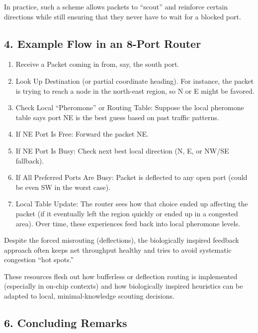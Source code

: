 \documentclass[../HFT-main.tex]{subfiles} %
\begin{document}
In practice, such a scheme allows packets to “scout” and reinforce certain directions while still ensuring that they never have to wait for a blocked port.

\subsection{4. Example Flow in an 8-Port Router}

\begin{enumerate}
\item	Receive a Packet coming in from, say, the south port.
\item	Look Up Destination (or partial coordinate heading). For instance, the packet is trying to reach a node in the north-east region, so N or E might be favored.
\item	Check Local “Pheromone” or Routing Table: Suppose the local pheromone table says port NE is the best guess based on past traffic patterns.
\item	If NE Port Is Free: Forward the packet NE.
\item	If NE Port Is Busy: Check next best local direction (N, E, or NW/SE fallback).
\item	If All Preferred Ports Are Busy: Packet is deflected to any open port (could be even SW in the worst case).
\item	Local Table Update: The router sees how that choice ended up affecting the packet (if it eventually left the region quickly or ended up in a congested area). Over time, these experiences feed back into local pheromone levels.
\end{enumerate}

Despite the forced misrouting (deflections), the biologically inspired feedback approach often keeps net throughput healthy and tries to avoid systematic congestion ``hot spots.''


These resources flesh out how bufferless or deflection routing is implemented (especially in on-chip contexts) and how biologically inspired heuristics can be adapted to local, minimal-knowledge scouting decisions.

\subsection{6. Concluding Remarks}
\end{document}
